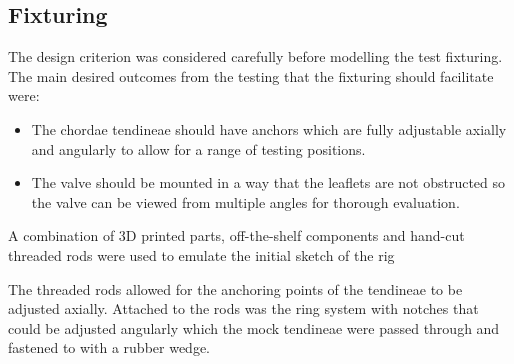 \subsection{Fixturing}
The design criterion was considered carefully before modelling the test fixturing. The main desired outcomes from the testing that the fixturing should facilitate were:
\begin{itemize}
    \item The chordae tendineae should have anchors which are fully adjustable axially and angularly to allow for a range of testing positions.
    \item The valve should be mounted in a way that the leaflets are not obstructed so the valve can be viewed from multiple angles for thorough evaluation.

\end{itemize}

A combination of 3D printed parts, off-the-shelf components and hand-cut threaded rods were used to emulate the initial sketch of the rig

The threaded rods allowed for the anchoring points of the tendineae to be adjusted axially.
Attached to the rods was the ring system with notches that could be adjusted angularly which the mock tendineae were passed through and fastened to with a rubber wedge.
